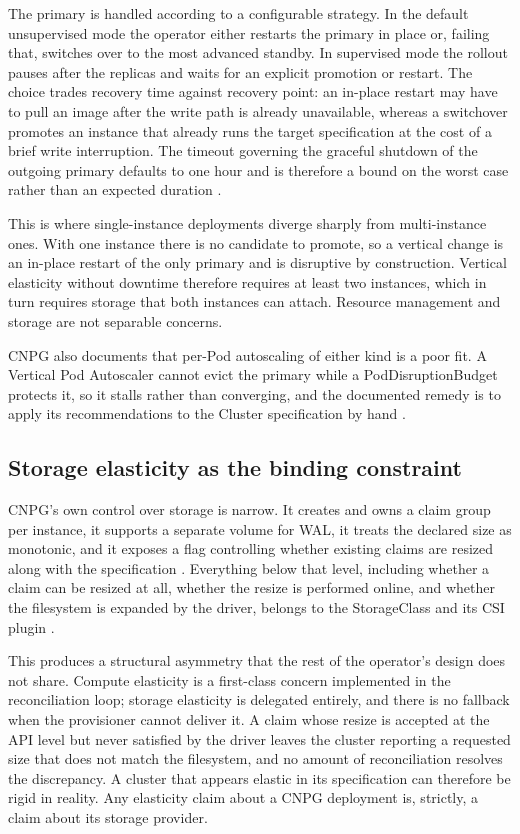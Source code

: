 \documentclass[11pt,a4paper]{article}
\begin{document}
The primary is handled according to a configurable strategy. In the default unsupervised mode the operator either restarts the primary in place or, failing that, switches over to the most advanced standby. In supervised mode the rollout pauses after the replicas and waits for an explicit promotion or restart. The choice trades recovery time against recovery point: an in-place restart may have to pull an image after the write path is already unavailable, whereas a switchover promotes an instance that already runs the target specification at the cost of a brief write interruption. The timeout governing the graceful shutdown of the outgoing primary defaults to one hour and is therefore a bound on the worst case rather than an expected duration \cite{cnpg-api}.

This is where single-instance deployments diverge sharply from multi-instance ones. With one instance there is no candidate to promote, so a vertical change is an in-place restart of the only primary and is disruptive by construction. Vertical elasticity without downtime therefore requires at least two instances, which in turn requires storage that both instances can attach. Resource management and storage are not separable concerns.

CNPG also documents that per-Pod autoscaling of either kind is a poor fit. A Vertical Pod Autoscaler cannot evict the primary while a PodDisruptionBudget protects it, so it stalls rather than converging, and the documented remedy is to apply its recommendations to the Cluster specification by hand \cite{cnpg-resource-management}.

\subsection{Storage elasticity as the binding constraint}

CNPG's own control over storage is narrow. It creates and owns a claim group per instance, it supports a separate volume for WAL, it treats the declared size as monotonic, and it exposes a flag controlling whether existing claims are resized along with the specification \cite{cnpg-api}. Everything below that level, including whether a claim can be resized at all, whether the resize is performed online, and whether the filesystem is expanded by the driver, belongs to the StorageClass and its CSI plugin \cite{k8s-csi}.

This produces a structural asymmetry that the rest of the operator's design does not share. Compute elasticity is a first-class concern implemented in the reconciliation loop; storage elasticity is delegated entirely, and there is no fallback when the provisioner cannot deliver it. A claim whose resize is accepted at the API level but never satisfied by the driver leaves the cluster reporting a requested size that does not match the filesystem, and no amount of reconciliation resolves the discrepancy. A cluster that appears elastic in its specification can therefore be rigid in reality. Any elasticity claim about a CNPG deployment is, strictly, a claim about its storage provider.
\end{document}
